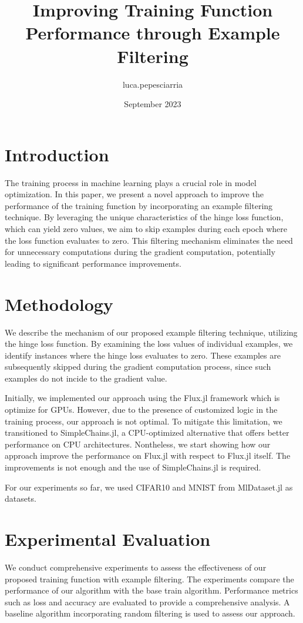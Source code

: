 \documentclass{article}
\title{Improving Training Function Performance through Example Filtering}
\author{luca.pepesciarria }
\date{September 2023}
\begin{document}
\maketitle

\section{Introduction}
The training process in machine learning plays a crucial role in model optimization. In this paper, we present a novel approach to improve the performance of the training function by incorporating an example filtering technique. By leveraging the unique characteristics of the hinge loss function, which can yield zero values, we aim to skip examples during each epoch where the loss function evaluates to zero. This filtering mechanism eliminates the need for unnecessary computations during the gradient computation, potentially leading to significant performance improvements.

\section{Methodology}
We describe the mechanism of our proposed example filtering technique, utilizing the hinge loss function. By examining the loss values of individual examples, we identify instances where the hinge loss evaluates to zero. These examples are subsequently skipped during the gradient computation process, since such examples do not incide to the gradient value.

Initially, we implemented our approach using the Flux.jl framework which is optimize for GPUs. However, due to the presence of customized logic in the training process, our approach is not optimal. To mitigate this limitation, we transitioned to SimpleChains.jl, a CPU-optimized alternative that offers better performance on CPU architectures. Nontheless, we start showing how our approach improve the performance on Flux.jl with respect to Flux.jl itself. The improvements is not enough and the use of SimpleChains.jl is required.

For our experiments so far, we used CIFAR10 and MNIST from MlDataset.jl as datasets.

\section{Experimental Evaluation}
We conduct comprehensive experiments to assess the effectiveness of our proposed training function with example filtering. The experiments compare the performance of our algorithm with the base train algorithm. Performance metrics such as loss and accuracy are evaluated to provide a comprehensive analysis. A baseline algorithm incorporating random filtering is used to assess our approach.
\end{document}
